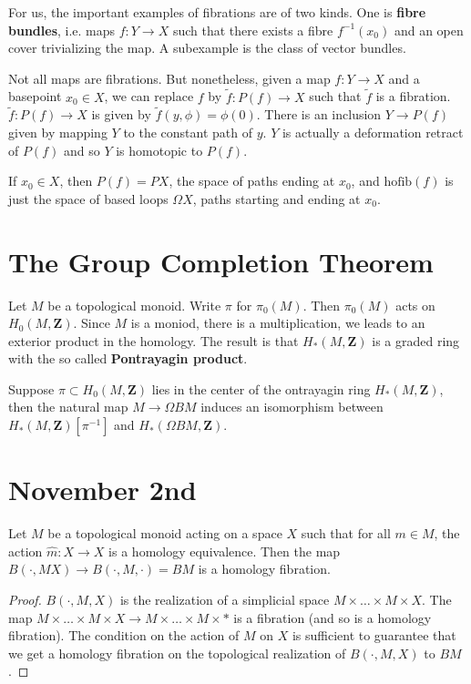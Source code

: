 \begin{example}
    For us, the important examples of fibrations are of two kinds. One is {\bf fibre bundles}, i.e. maps $f: Y \to X$ such that there exists a fibre $f^{-1}(x_0)$ and an open cover trivializing the map. A subexample is the class of vector bundles.
\end{example}

Not all maps are fibrations. But nonetheless, given a map $f:Y \to X$ and a basepoint $x_0 \in X$, we can replace $f$ by $\tilde{f}: P(f) \to X$ such that $\tilde{f}$ is a fibration. $\tilde{f}: P(f) \to X$ is given by $\tilde{f}(y,\phi) = \phi(0)$. There is an inclusion $Y \to P(f)$ given by mapping $Y$ to the constant path of $y$. $Y$ is actually a deformation retract of $P(f)$ and so $Y$ is homotopic to $P(f)$.

\begin{example}
    If $x_0 \in X$, then $P(f) = PX$, the space of paths ending at $x_0$, and $\text{hofib}(f)$ is just the space of based loops $\Omega X$, paths starting and ending at $x_0$.
\end{example}

\section{The Group Completion Theorem}

Let $M$ be a topological monoid. Write $\pi$ for $\pi_0(M)$. Then $\pi_0(M)$ acts on $H_0(M,\mathbf{Z})$. Since $M$ is a moniod, there is a multiplication, we leads to an exterior product in the homology. The result is that $H_*(M,\mathbf{Z})$ is a graded ring with the so called {\bf Pontrayagin product}.

\begin{theorem}
    Suppose $\pi \subset H_0(M,\mathbf{Z})$ lies in the center of the ontrayagin ring $H_*(M,\mathbf{Z})$, then the natural map $M \to \Omega BM$ induces an isomorphism between $H_*(M,\mathbf{Z})[\pi^{-1}]$ and $H_*(\Omega BM, \mathbf{Z})$.
\end{theorem}

\section{November 2nd}

\begin{theorem}
    Let $M$ be a topological monoid acting on a space $X$ such that for all $m \in M$, the action $\widehat{m}: X \to X$ is a homology equivalence. Then the map $B(\cdot, MX) \to B(\cdot,M,\cdot) = BM$ is a homology fibration.
\end{theorem}
\begin{proof}
    $B(\cdot,M,X)$ is the realization of a simplicial space $M \times \dots \times M \times X$. The map $M \times \dots \times M \times X \to M \times \dots \times M \times *$ is a fibration (and so is a homology fibration). The condition on the action of $M$ on $X$ is sufficient to guarantee that we get a homology fibration on the topological realization of $B(\cdot,M,X)$ to $BM$.
\end{proof}

